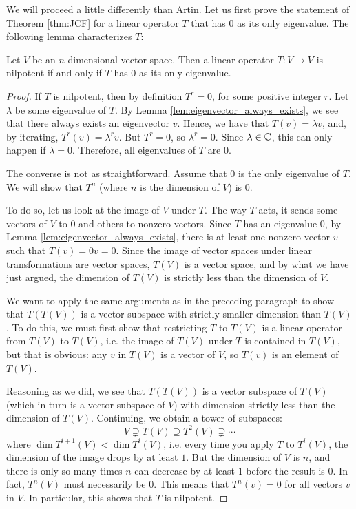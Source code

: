 We will proceed a little differently than Artin. Let us first 
prove the statement of Theorem \ref{thm:JCF} for a linear operator 
$T$ that has $0$ as its only eigenvalue. The following lemma
characterizes $T$:

\begin{lem}\label{lem:nilpotent_equiv_zero_eigenvalue}
Let $V$ be an $n$-dimensional vector space. Then a linear operator 
$T: V \to V$ is nilpotent if and only if $T$ has $0$ as its only 
eigenvalue.
\end{lem}
\begin{proof}
If $T$ is nilpotent, then by definition $T^r = 0$, for some positive
integer $r$. Let $\lambda$ be some eigenvalue of $T$. By Lemma 
\ref{lem:eigenvector_always_exists}, we see that there always exists
an eigenvector $v$. Hence, we have that $T(v) = \lambda v$, and, by
iterating, $T^r(v) = \lambda^r v$. But $T^r = 0$, so $\lambda^r = 0$.
Since $\lambda \in \mathbb{C}$, this can only happen if $\lambda = 0$. 
Therefore, all eigenvalues of $T$ are $0$.

The converse is not as straightforward. Assume that $0$ is the only
eigenvalue of $T$. We will show that $T^n$ (where $n$ is the dimension
of $V$) is $0$.

To do so, let us look at the image of $V$ under $T$. The
way $T$ acts, it sends some vectors of $V$ to $0$ and others to 
nonzero vectors. Since $T$ has an eigenvalue $0$, by Lemma 
\ref{lem:eigenvector_always_exists}, there is at least one nonzero
vector $v$ such that 
$T(v) = 0v = 0$. Since the image of vector spaces under linear
transformations are vector spaces, $T(V)$ is a vector space,
and by what we have just argued, the dimension of $T(V)$ is 
strictly less than the dimension of $V$.

We want to apply the same arguments as in the preceding paragraph 
to show that $T(T(V))$ is a vector subspace with strictly smaller 
dimension than $T(V)$. To do this, we must first show that 
restricting $T$ to $T(V)$ is a linear operator from $T(V)$ to 
$T(V)$, i.e. the image of $T(V)$ under $T$ is contained in $T(V)$,
but that is obvious: any $v$ in $T(V)$ is a vector of $V$, so
$T(v)$ is an element of $T(V)$.

Reasoning as we did, we see that $T(T(V))$ is a vector subspace
of $T(V)$ (which in turn is a vector subspace of $V$) with dimension
strictly less than the dimension of $T(V)$. Continuing, we obtain
a tower of subspaces:
\[
V \supsetneq T(V) \supseteq T^2(V) \supsetneq \cdots
\]
where $\dim T^{i + 1}(V) < \dim T^i(V)$, i.e. every time you apply 
$T$ to $T^i(V)$, the dimension of the image drops by at least $1$. 
But the dimension of $V$ is $n$, and there is only so many times
$n$ can decrease by at least $1$ before the result is $0$. In
fact, $T^n(V)$ must necessarily be $0$. This means that $T^n(v) = 0$
for all vectors $v$ in $V$. In particular, this shows that $T$ is
nilpotent.
\end{proof}

